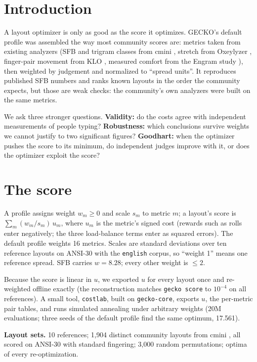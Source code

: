 \documentclass{gecko-paper}
\begin{document}
\begin{paperbody}
\section{Introduction}
A layout optimizer is only as good as the score it optimizes. GECKO's default profile  was assembled the way most community scores are: metrics taken from existing analyzers (SFB and trigram classes from cmini , stretch from Oxeylyzer , finger-pair movement from KLO , measured comfort from the Engram study ), then weighted by judgement and normalized to “spread units”. It reproduces published SFB numbers and ranks known layouts in the order the community expects, but those are weak checks: the community's own analyzers were built on the same metrics.

We ask three stronger questions.
\textbf{Validity:} do the costs agree with independent measurements of people typing?
\textbf{Robustness:} which conclusions survive weights we cannot justify to two significant figures?
\textbf{Goodhart:} when the optimizer pushes the score to its minimum, do independent judges improve with it, or does the optimizer exploit the score?

\section{The score}
A profile assigns weight $w_m\ge 0$ and scale $s_m$ to metric $m$; a layout's score is $\sum_m (w_m/s_m)\,u_m$, where $u_m$ is the metric's signed cost (rewards such as rolls enter negatively; the three load-balance terms enter as squared errors). The default profile weights 16 metrics. Scales are standard deviations over ten reference layouts on ANSI-30 with the \texttt{english} corpus, so “weight 1” means one reference spread. SFB carries $w=8.28$; every other weight is $\le 2$.

Because the score is linear in $u$, we exported $u$ for every layout once and re-weighted offline exactly (the reconstruction matches \texttt{gecko score} to $10^{-4}$ on all references). A small tool, \texttt{costlab}, built on \texttt{gecko-core}, exports $u$, the per-metric pair tables, and runs simulated annealing under arbitrary weights (20M evaluations; three seeds of the default profile find the same optimum, 17.561).

\textbf{Layout sets.} 10 references; 1{,}904 distinct community layouts from cmini , all scored on ANSI-30 with standard fingering; 3{,}000 random permutations; optima of every re-optimization.


\end{paperbody}
\end{document}
